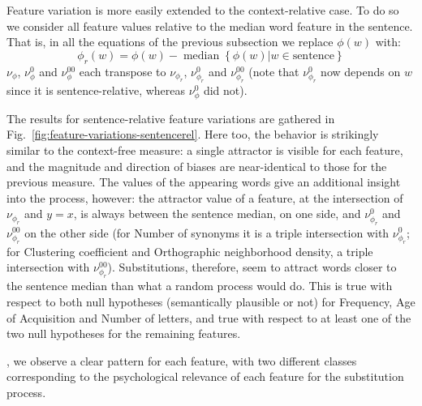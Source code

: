 \begin{new}
Feature variation is more easily extended to the context-relative case.
To do so we consider all feature values relative to the median word feature in the sentence.
That is, in all the equations of the previous subsection we replace $\phi(w)$ with:
$$\phi_r(w) = \phi(w) - \operatorname{median}\left\lbrace \phi(w) | w \in \text{sentence} \right\rbrace$$
$\nu_{\phi}$, $\nu_{\phi}^0$ and $\nu_{\phi}^{00}$ each transpose to $\nu_{\phi_r}$, $\nu_{\phi_r}^0$ and $\nu_{\phi_r}^{00}$ (note that $\nu_{\phi_r}^0$ now depends on $w$ since it is sentence-relative, whereas $\nu_{\phi}^0$ did not).


The results for sentence-relative feature variations are gathered in Fig.~\ref{fig:feature-variations-sentencerel}.
Here too, the behavior is strikingly similar to the context-free measure:
a single attractor is visible for each feature, and the magnitude and direction of biases are near-identical to those for the previous measure.
The values of the appearing words give an additional insight into the process, however:
the attractor value of a feature, at the intersection of $\nu_{\phi_r}$ and $y=x$, is always between the sentence median, on one side, and $\nu_{\phi_r}^0$ and $\nu_{\phi_r}^{00}$ on the other side (for Number of synonyms it is a triple intersection with $\nu_{\phi_r}^0$; for Clustering coefficient and Orthographic neighborhood density, a triple intersection with $\nu_{\phi_r}^{00}$).
Substitutions, therefore, seem to attract words closer to the sentence median than what a random process would do.
This is true with respect to both null hypotheses (semantically plausible or not) for Frequency, Age of Acquisition and Number of letters, and true with respect to at least one of the two null hypotheses for the remaining features.

\end{new}

\medskip

, we observe a clear  pattern for each feature, with two different classes corresponding to the psychological relevance of each feature for the substitution process.

